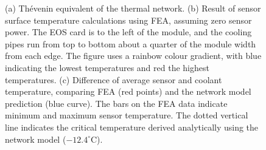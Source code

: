 \begin{figure}[ht]
\centering
{}\quad
{}\quad\quad
{}
\caption{(a) Th\'{e}venin equivalent of the thermal network. (b) Result of sensor surface temperature calculations using FEA, assuming zero sensor power. The EOS card is to the left of the module, and the cooling pipes run from top to bottom about a quarter of the module width from each edge. The figure uses a rainbow colour gradient, with blue indicating the lowest temperatures and red the highest temperatures. (c) Difference of average sensor and coolant temperature, comparing FEA (red points) and the network model prediction (blue curve). The bars on the FEA data indicate minimum and maximum sensor temperature. The dotted vertical line indicates the critical temperature derived analytically using the network model ($-12.4^\circ$C).}
\label{fig:verification}
\end{figure}
